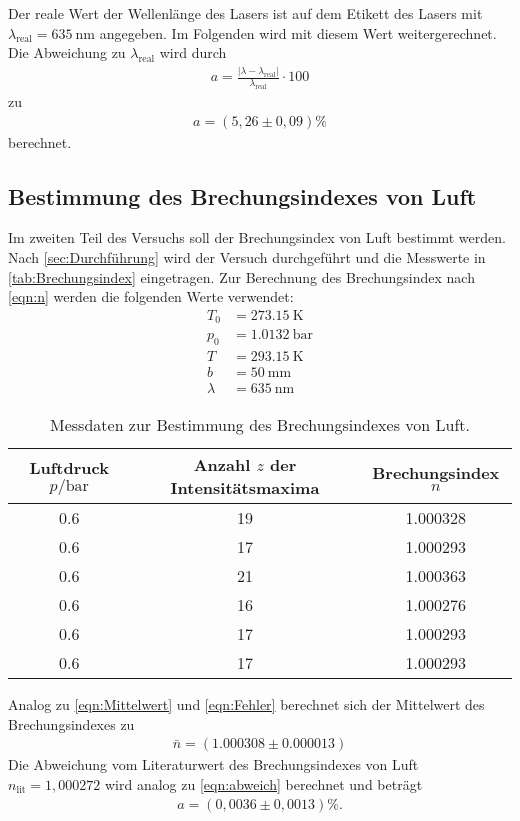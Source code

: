 Der reale Wert der Wellenlänge des Lasers ist auf dem Etikett des Lasers mit $\lambda_{\text{real}}=\qty{635}{\nano\meter}$ angegeben.
Im Folgenden wird mit diesem Wert weitergerechnet.
Die Abweichung zu $\lambda_{\text{real}}$ wird durch
\begin{align}
  a=\frac{|\lambda-\lambda_{\text{real}}|}{\lambda_{\text{real}}}\cdot 100 \label{eqn:abweich}
\end{align}
zu
\begin{align*}
  a=(5,26 \pm 0,09) \si{\percent}
\end{align*}
berechnet.

\subsection{Bestimmung des Brechungsindexes von Luft}
\label{sub:Brechungsindex}

Im zweiten Teil des Versuchs soll der Brechungsindex von Luft bestimmt werden.
Nach \autoref{sec:Durchführung} wird der Versuch durchgeführt und die Messwerte in \autoref{tab:Brechungsindex} eingetragen.
Zur Berechnung des Brechungsindex nach \autoref{eqn:n}
werden die folgenden Werte verwendet\cite{V401}:
\begin{align*}
  T_0 &= \qty{273.15}{\kelvin}\\
  p_0 &= \qty{1.0132}{\bar}\\
  T &= \qty{293.15}{\kelvin}\\
  b &=\qty{50}{\milli\meter}\\
  \lambda &=\qty{635}{\nano\meter}
\end{align*}

\begin{table}[H]
  \centering
  \caption{Messdaten zur Bestimmung des Brechungsindexes von Luft.}
  \label{tab:Brechungsindex}
  \begin{tabular}{S[table-format=1.1] S[table-format=2.0] S[table-format=1.6]}
  \toprule
  {Luftdruck $ p / \si{\bar}$} & {Anzahl $z$ der Intensitätsmaxima} & {Brechungsindex $n$}\\
   & 19 & 1.000328 \\
    0.6 & 17 & 1.000293 \\
    0.6 & 21 & 1.000363 \\
    0.6 & 16 & 1.000276 \\
    0.6 & 17 & 1.000293 \\
    0.6 & 17 & 1.000293 \\
  \bottomrule
  \end{tabular}
\end{table}

Analog zu \autoref{eqn:Mittelwert} und \autoref{eqn:Fehler} berechnet sich der Mittelwert des Brechungsindexes zu
\begin{align*}
  \bar{n}= (1.000308 \pm 0.000013)
\end{align*}
Die Abweichung vom Literaturwert \cite{Brechungsindex} des Brechungsindexes von Luft $n_{\text{lit}}= 1,000272$
wird analog zu \autoref{eqn:abweich} berechnet und beträgt
\begin{align*}
  a=(0,0036 \pm 0,0013) \si{\percent}.
\end{align*}


